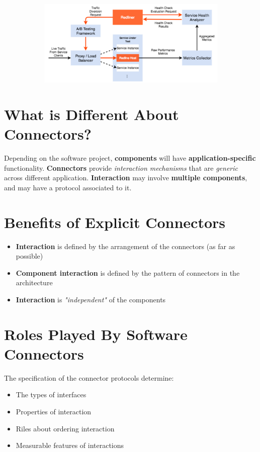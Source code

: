 \documentclass[a4paper]{report}
\begin{document}
\begin{figure}[H]
\centering
\hskip-2.5cm\begin{subfigure}{1\textwidth}
  \includegraphics[width=1\linewidth]
  {images/10-linked-redliner.png}
\end{subfigure}
\end{figure}

\section{What is Different About Connectors?}
Depending on the software project, \textbf{components} will have \textbf{application-specific} functionality. \textbf{Connectors} provide \textit{interaction mechanisms} that are \textit{generic} across different application. \textbf{Interaction} may involve \textbf{multiple components}, and may have a protocol associated to it.\\

\section{Benefits of Explicit Connectors}
\begin{itemize}
\item \textbf{Interaction} is defined by the arrangement of the connectors (as far as possible)
\item \textbf{Component interaction} is defined by the pattern of connectors in the architecture
\item \textbf{Interaction} is \textit{"independent"} of the components
\end{itemize}

\section{Roles Played By Software Connectors}
The specification of the connector protocols determine:
\begin{itemize}
\item The types of interfaces
\item Properties of interaction
\item Riles about ordering interaction
\item Measurable features of interactions\\
\end{itemize}
\end{document}
